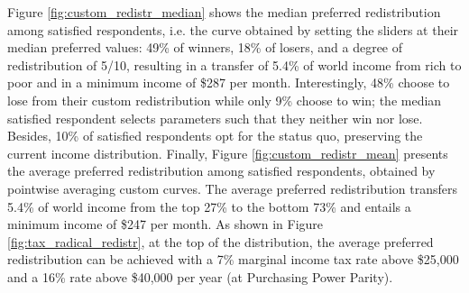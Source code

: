 \documentclass[12pt,english]{article}
\begin{document}
\begin{bibunit}


Figure \ref{fig:custom_redistr_median} shows the median preferred redistribution among satisfied respondents, i.e. the curve obtained by setting the sliders at their median preferred values: 49\% of winners, 18\% of losers, and a degree of redistribution of 5/10, resulting in a transfer of 5.4\% of world income from rich to poor and in a minimum income of \$287 per month. 
Interestingly, 48\% choose to lose from their custom redistribution while only 9\% choose to win; the median satisfied respondent selects parameters such that they neither win nor lose. Besides, 10\% of satisfied respondents opt for the status quo, preserving the current income distribution. 
Finally, Figure \ref{fig:custom_redistr_mean} presents the average preferred redistribution among satisfied respondents, obtained by pointwise averaging custom curves. 
The average preferred redistribution transfers 5.4\% of world income from the top 27\% to the bottom 73\% and entails a minimum income of \$247 per month.  
As shown in Figure \ref{fig:tax_radical_redistr}, at the top of the distribution, the average preferred redistribution can be achieved with a 7\% marginal income tax rate above \$25,000 and a 16\% rate above \$40,000 per year (at Purchasing Power Parity). 


\end{bibunit}
\end{document}
